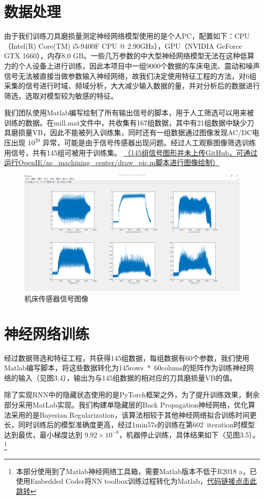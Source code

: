\section{数据处理}
% 
由于我们训练刀具磨损量测定神经网络模型使用的是个人PC，配置如下：CPU（Intel(R) Core(TM) i5-9400F CPU @ 2.90GHz），GPU（NVIDIA GeForce GTX 1660），内存8.0 GB。一些几万参数的中大型神经网络模型无法在这种低算力的个人设备上进行训练，因此本项目中一组9000个数据的车床电流、震动和噪声信号无法被直接当做参数输入神经网络，故我们决定使用特征工程的方法，对6组采集的信号进行时域、频域分析，大大减少输入数据的量，并对分析后的数据进行筛选，选取对模型较为敏感的特征。\par
我们团队使用Matlab编写绘制了所有输出信号的脚本，用于人工筛选可以用来被训练的数据。在mill.mat文件中，共收集有167组数据，其中有21组数据中缺少刀具磨损量VB，因此不能被列入训练集，同时还有一组数据通过图像发现AC/DC电压出现 $ 10^{29} $ 异常，可能是由于信号传感器出现问题。经过人工观察图像筛选训练用信号，共有145组可被用于训练集。
\href{https://github.com/QianZeHao123/OpenIE/blob/main/nc_machining_center/draw_pic.m}{（145组信号图形并未上传GitHub，可通过运行OpenIE/nc\_machining\_center/draw\_pic.m脚本进行图像绘制）}\par
% 
\begin{figure}[htp]
    \centering
    \includegraphics[width=14cm]{Chapter2/signal.png}
    \caption{机床传感器信号图像}
\end{figure}
% 
% 
% 
\section{神经网络训练}
经过数据筛选和特征工程，共获得145组数据，每组数据有60个参数，我们使用Matlab编写脚本，将这些数据转化为145rows~*~60colums的矩阵作为训练神经网络的输入（见图3.4），输出为与145组数据的相对应的刀具磨损量VB的值。\par
除了实现RNN中的隐藏状态使用的是PyTorch框架之外，为了提升训练效果，剩余部分采用MatLab实现。我们构建单隐藏层的Back Propagation神经网络，优化算法采用的是Bayesian Regularization，该算法相较于其他神经网络拟合训练时间更长，同时训练后的模型准确度更高，经过1min57s的训练在第602~iteration时模型达到最优，最小梯度达到 $ 9.92 \times 10^{-8} $，机器停止训练，具体结果如下（见图3.5）。
\footnote{本部分使用到了Matlab神经网络工具箱，需要Matlab版本不低于R2018 a，已使用Embedded Coder将NN toolbox训练过程转化为Matlab，\href{https://github.com/QianZeHao123/OpenIE/blob/main/nc_machining_center/neural_network_train.m}{代码链接点击此跳转}}
% 
% 
